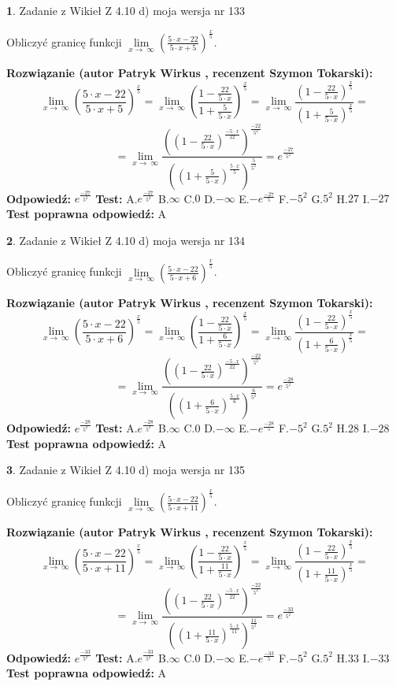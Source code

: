\documentclass[12pt, a4paper]{article}
\theoremstyle{definition} %
\newtheorem{zad}{}
\newcommand{\zadStart}[1]{\begin{zad}#1\newline}
\newcommand{\zadStop}{\end{zad}}
\newcommand{\rozwStart}[2]{\noindent \textbf{Rozwiązanie (autor #1 , recenzent #2): }\newline}
\newcommand{\rozwStop}{\newline}
\newcommand{\odpStart}{\noindent \textbf{Odpowiedź:}\newline}
\newcommand{\odpStop}{\newline}
\newcommand{\testStart}{\noindent \textbf{Test:}\newline}
\newcommand{\testStop}{\newline}
\newcommand{\kluczStart}{\noindent \textbf{Test poprawna odpowiedź:}\newline}
\newcommand{\kluczStop}{\newline}
\begin{document}
\zadStart{Zadanie z Wikieł Z 4.10 d) moja wersja nr 133}


Obliczyć granicę funkcji  $\lim\limits_{x\to\ \infty}(\frac{5\cdot x-22}{5\cdot x+5})^{\frac{x}{5}}$.
\zadStop
\rozwStart{Patryk Wirkus}{Szymon Tokarski}
$$\lim\limits_{x\to\ \infty}(\frac{5\cdot x-22}{5\cdot x+5})^{\frac{x}{5}} = \lim\limits_{x\to\ \infty}(\frac{1-\frac{22}{5\cdot x}}{1+\frac{5}{5\cdot x}})^{\frac{x}{5}}=\lim\limits_{x\to\ \infty}\frac{(1-\frac{22}{5\cdot x})^{\frac{x}{5}}}{(1+\frac{5}{5\cdot x})^{\frac{x}{5}}}=$$
$$=\lim\limits_{x\to\ \infty}\frac{((1-\frac{22}{5\cdot x})^{\frac{-5\cdot x}{22}})^{\frac{-22}{5^{2}}}}{((1+\frac{5}{5\cdot x})^{\frac{5\cdot x}{5}})^{\frac{5}{5^{2}}}}=e^{\frac{-27}{5^{2}}}$$
\rozwStop
\odpStart
$e^{\frac{-27}{5^{2}}}$
\odpStop
\testStart
A.$e^{\frac{-27}{5^{2}}}$ B.$\infty$ C.$0$ D.$-\infty$ E.$-e^{\frac{-27}{5}}$
F.$-5^{2}$ G.$5^{2}$
H.$27$
I.$-27$
\testStop
\kluczStart
A
\kluczStop



\zadStart{Zadanie z Wikieł Z 4.10 d) moja wersja nr 134}


Obliczyć granicę funkcji  $\lim\limits_{x\to\ \infty}(\frac{5\cdot x-22}{5\cdot x+6})^{\frac{x}{5}}$.
\zadStop
\rozwStart{Patryk Wirkus}{Szymon Tokarski}
$$\lim\limits_{x\to\ \infty}(\frac{5\cdot x-22}{5\cdot x+6})^{\frac{x}{5}} = \lim\limits_{x\to\ \infty}(\frac{1-\frac{22}{5\cdot x}}{1+\frac{6}{5\cdot x}})^{\frac{x}{5}}=\lim\limits_{x\to\ \infty}\frac{(1-\frac{22}{5\cdot x})^{\frac{x}{5}}}{(1+\frac{6}{5\cdot x})^{\frac{x}{5}}}=$$
$$=\lim\limits_{x\to\ \infty}\frac{((1-\frac{22}{5\cdot x})^{\frac{-5\cdot x}{22}})^{\frac{-22}{5^{2}}}}{((1+\frac{6}{5\cdot x})^{\frac{5\cdot x}{6}})^{\frac{6}{5^{2}}}}=e^{\frac{-28}{5^{2}}}$$
\rozwStop
\odpStart
$e^{\frac{-28}{5^{2}}}$
\odpStop
\testStart
A.$e^{\frac{-28}{5^{2}}}$ B.$\infty$ C.$0$ D.$-\infty$ E.$-e^{\frac{-28}{5}}$
F.$-5^{2}$ G.$5^{2}$
H.$28$
I.$-28$
\testStop
\kluczStart
A
\kluczStop



\zadStart{Zadanie z Wikieł Z 4.10 d) moja wersja nr 135}


Obliczyć granicę funkcji  $\lim\limits_{x\to\ \infty}(\frac{5\cdot x-22}{5\cdot x+11})^{\frac{x}{5}}$.
\zadStop
\rozwStart{Patryk Wirkus}{Szymon Tokarski}
$$\lim\limits_{x\to\ \infty}(\frac{5\cdot x-22}{5\cdot x+11})^{\frac{x}{5}} = \lim\limits_{x\to\ \infty}(\frac{1-\frac{22}{5\cdot x}}{1+\frac{11}{5\cdot x}})^{\frac{x}{5}}=\lim\limits_{x\to\ \infty}\frac{(1-\frac{22}{5\cdot x})^{\frac{x}{5}}}{(1+\frac{11}{5\cdot x})^{\frac{x}{5}}}=$$
$$=\lim\limits_{x\to\ \infty}\frac{((1-\frac{22}{5\cdot x})^{\frac{-5\cdot x}{22}})^{\frac{-22}{5^{2}}}}{((1+\frac{11}{5\cdot x})^{\frac{5\cdot x}{11}})^{\frac{11}{5^{2}}}}=e^{\frac{-33}{5^{2}}}$$
\rozwStop
\odpStart
$e^{\frac{-33}{5^{2}}}$
\odpStop
\testStart
A.$e^{\frac{-33}{5^{2}}}$ B.$\infty$ C.$0$ D.$-\infty$ E.$-e^{\frac{-33}{5}}$
F.$-5^{2}$ G.$5^{2}$
H.$33$
I.$-33$
\testStop
\kluczStart
A
\kluczStop
\end{document}
